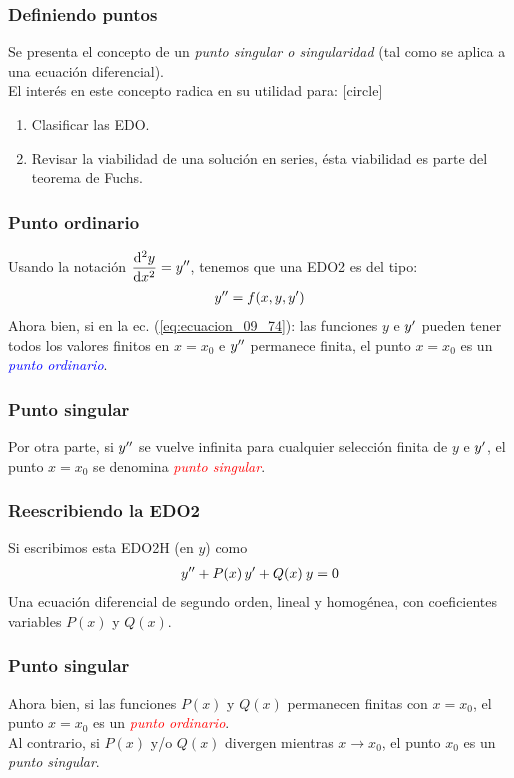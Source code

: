 \documentclass[12pt]{beamer}
\begin{document}
\begin{frame}
\frametitle{Definiendo puntos}
Se presenta el concepto de un \emph{punto singular o singularidad} (tal como se aplica a una ecuación diferencial).
\\
\bigskip
\pause
El interés en este concepto radica en su utilidad para:
[circle]
\begin{enumerate}[<+->]
\item Clasificar las EDO.
\item Revisar la viabilidad de una solución en series, ésta viabilidad es parte del teorema de Fuchs.
\end{enumerate}
\end{frame}
\begin{frame}
\frametitle{Punto ordinario}
Usando la notación $\displaystyle \dv[2]{y}{x} = {y}^{\prime \prime}$, tenemos que una EDO2 es del tipo:
\begin{align}
{y}^{\prime \prime} = f(x, y, {y}^{\prime})
\label{eq:ecuacion_09_74}
\end{align}
\pause
Ahora bien, si en la ec. (\ref{eq:ecuacion_09_74}): las funciones $y$ e ${y}^{\prime}$ pueden tener todos los valores finitos en $x = x_{0}$ e ${y}^{\prime \prime}$ permanece finita, el punto $x = x_{0}$ es un \emph{\textcolor{blue}{punto ordinario}}.
\end{frame}
\begin{frame}
\frametitle{Punto singular}
Por otra parte, si ${y}^{\prime \prime}$ se vuelve infinita para cualquier selección finita de $y$ e  ${y}^{\prime}$, el punto $x = x_{0}$ se denomina \emph{\textcolor{red}{punto singular}}.
\end{frame}
\begin{frame}
\frametitle{Reescribiendo la EDO2}
Si escribimos esta EDO2H (en $y$) como
\begin{align}
{y}^{\prime \prime} + P(x) \, {y}^{\prime} + Q(x) \: y = 0
\label{eq:ecuacion_09_75}
\end{align}
\pause
Una ecuación diferencial de segundo orden, lineal y homogénea, con coeficientes variables $P(x)$ y $Q(x)$.
\end{frame}
\begin{frame}
\frametitle{Punto singular}
Ahora bien, si las funciones $P(x)$ y $Q(x)$ permanecen finitas con $x = x_{0}$, el punto $x = x_{0}$ es un \emph{\textcolor{red}{punto ordinario}}.
\\
\bigskip
\pause
Al contrario, si $P(x)$ y/o $Q(x)$ divergen mientras $x \to x_{0}$, el punto $x_{0}$ es un \emph{\textcolor{green!50!black}{punto singular}}.
\end{frame}
\end{document}
